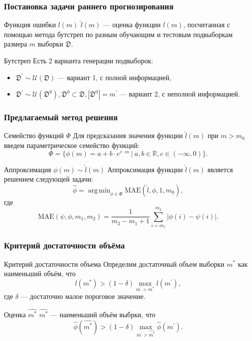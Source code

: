 \documentclass{beamer}
\DeclareMathOperator*{\argmin}{arg\,min}
\begin{document}
\begin{frame}
\frametitle{Постановка задачи раннего прогнозирования}
\begin{block}{Функция ошибки $l(m)$}
$\hat{l}(m)$ --- оценка функции $l(m)$, посчитанная с помощью метода бутстреп по разным обучающим и тестовым подвыборкам размера $m$ выборки $\mathfrak{D}$.
\end{block}

\begin{block}{Бутстреп}
Есть 2 варианта генерации подвыборок:
\begin{itemize}
		\item $\mathfrak D^{\prime} \sim \mathcal{U}(\mathfrak{D})$ --- вариант 1, с полной информацией,
		\item $\mathfrak D^{\prime} \sim \mathcal{U}(\mathfrak{D}^0), \mathfrak{D}^0 \subset \mathfrak{D}, |\mathfrak{D}^0| = m^{\prime}$ --- вариант 2, с неполной информацией.
\end{itemize}
\end{block}
\end{frame}

\begin{frame}
\frametitle{Предлагаемый метод решения}

\begin{block}{Семейство функций $\Phi$}
Для предсказания значения функции $\hat{l}(m)$ при $m > m_0$ введем параметрическое семейство функций:
$$
\Phi = \{\phi(m) =  a + b\cdot e^{c \cdot m} ~|~ a, b \in \mathbb{R}, c \in (-\infty, 0)\}.
$$
\end{block}

\begin{block}{Аппроксимация $\phi(m) \sim \hat{l}(m)$}
Аппроксимация функции  $\hat{l}(m)$ является решением следующей задачи:
$$
\hat{\phi} =  \argmin_{\phi \in \Phi}\text{MAE}(\hat{l}, \phi, 1, m_0),
$$
где
$$
\text{MAE}(\psi, \phi, m_1, m_2) = \frac{1}{m_2 - m_1 + 1}\sum_{i=m_1}^{m_2}|\phi(i) - \psi(i)|.
$$
\end{block}

\end{frame}

\begin{frame}
\frametitle{Критерий достаточности объёма}

\begin{block}{Критерий достаточности объема}
Определим достаточный объем выборки $m^*$ как наименьший объём, что
$$
l(m^*) > (1 - \delta)\max\limits_{m^{\prime} > m^*}l(m^{\prime}),
$$
где $\delta$ --- достаточно малое пороговое значение.
\end{block}

\begin{block}{Оценка $\hat{m^*}$}
$\hat{m^*}$ --- наименьший объём выбрки, что
$$
\hat{\phi}(\hat{m^*}) > (1 - \delta)\max\limits_{m^{\prime} > \hat{m^*}}\hat{\phi}(m^{\prime}).
$$
\end{block}

\end{frame}
\end{document}
